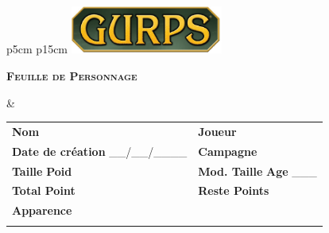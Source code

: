 \documentclass[11pt,twoside,a4paper]{article}
\def\FRdefFichePerso{Feuille de Personnage}
\def\FRdefNom{\textbf{Nom} \dotfill }
\def\FRdefDateCreation{\textbf{Date de cr{\'e}ation} \_\_/\_\_/\_\_\_\_ }
\def\FRdefTaille{\textbf{Taille} \dotfill }
\def\FRdefPoid{\textbf{Poid} \dotfill }
\def\FRdefTotalPoints{\textbf{Total Point} \dotfill }
\def\FRdefRestePoints{\textbf{Reste Points} \dotfill }
\def\FRdefJoueur{\textbf{Joueur} \dotfill }
\def\FRdefCampagne{\textbf{Campagne} \dotfill }
\def\FRdefModificateurTaille{\textbf{Mod. Taille} \dotfill }
\def\FRdefAge{\textbf{Age} \_\_\_}
\def\FRdefApparenceMain{\textbf{Apparence} \dotfill }
\begin{document}
\begin{tabular}[c]{p{5cm} p{15cm}}
	\includegraphics[width=5cm]{../../../../../imgGraphics/rolePlayingGame/gurpsLogo.png} 
	\begin{center} \textbf{\textsc{\FRdefFichePerso}} \end{center} &
	\begin{tabular}[c]{p{6cm} p{7cm}}
		\FRdefNom	 				& \FRdefJoueur 								 \\
		\FRdefDateCreation			& \FRdefCampagne							 \\
		\FRdefTaille \FRdefPoid 	& \FRdefModificateurTaille \FRdefAge		 \\
		\FRdefTotalPoints			& \FRdefRestePoints							 \\
		\multicolumn{2}{p{13.5cm}}{\FRdefApparenceMain}							 \\
		 \\
	\end{tabular} \\
\end{tabular}
\end{document}

